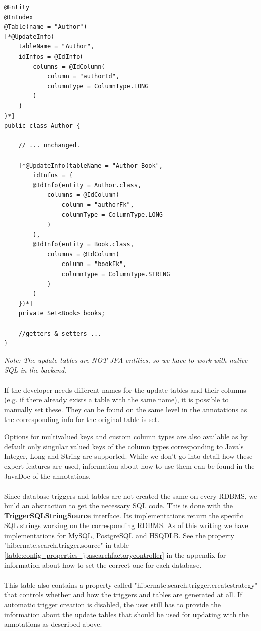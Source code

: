 \lstset{language=java}
\begin{lstlisting}[frame=htrbl, caption={Author.java with Hibernate Search annotations}, label={lst:author.java_3}]
@Entity
@InIndex
@Table(name = "Author")
[*@UpdateInfo(
	tableName = "Author", 
	idInfos = @IdInfo(
		columns = @IdColumn(
			column = "authorId", 
			columnType = ColumnType.LONG
		)
	)
)*]
public class Author {
	
	// ... unchanged.
	
	[*@UpdateInfo(tableName = "Author_Book", 
		idInfos = {
		@IdInfo(entity = Author.class, 
			columns = @IdColumn(
				column = "authorFk",
				columnType = ColumnType.LONG
			)
		),
		@IdInfo(entity = Book.class,
			columns = @IdColumn(
				column = "bookFk",
				columnType = ColumnType.STRING
			)
		)
	})*]
	private Set<Book> books;
	
	//getters & setters ...
}
\end{lstlisting}
\noindent
\textit{Note: The update tables are NOT JPA entities, so we have to work with native SQL in the backend}.
\\\\
\noindent
If the developer needs different names for the update tables and their columns (e.g. if there already exists a table with the same name), it is possible to manually set these. They can be found on the same level in the annotations as the corresponding info for the original table is set.

\pagebreak

\noindent
Options for multivalued keys and custom column types are also available as by default only singular valued keys of the column types corresponding to Java's Integer, Long and String are supported. While we don't go into detail how these expert features are used, information about how to use them can be found in the JavaDoc of the annotations.
\\\\
Since database triggers and tables are not created the same on every RDBMS, we build an abstraction to get the necessary SQL code. This is done with the \textbf{TriggerSQLStringSource} interface. Its implementations return the specific SQL strings working on the corresponding RDBMS. As of this writing we have implementations for MySQL, PostgreSQL and HSQDLB. See the property "hibernate.search.trigger.source" in table \ref{table:config_properties_jpasearchfactorycontroller} in the appendix for information about how to set the correct one for each database.
\\\\
This table also contains a property called "hibernate.search.trigger.createstrategy" that controls whether and how the triggers and tables are generated at all. If automatic trigger creation is disabled, the user still has to provide the information about the update tables that should be used for updating with the annotations as described above.

